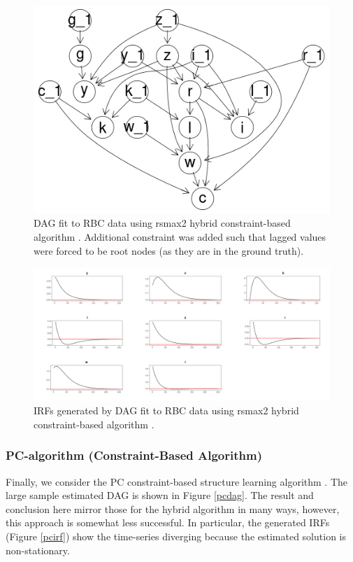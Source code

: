 \documentclass{article}
\begin{document}
\begin{figure}
  \centering  
  \includegraphics[width=0.6\linewidth]{images/rbc_hybrid_dag.png}
  \caption{DAG fit to RBC data using rsmax2 hybrid constraint-based algorithm \parencite{scutari2014multiple}. Additional constraint was added such that lagged values were forced to be root nodes (as they are in the ground truth).}
  \label{hdag}
\end{figure}

\begin{figure}
  \centering  
  \includegraphics[width=0.6\linewidth]{images/rbc_hybrid_irf.png}
  \caption{IRFs generated by DAG fit to RBC data using rsmax2 hybrid constraint-based algorithm \parencite{scutari2014multiple}.}
  \label{hirf}
\end{figure}

\subsubsection{PC-algorithm (Constraint-Based Algorithm)} \label{pc}

Finally, we consider the PC constraint-based structure learning algorithm \parencite{spirtes2000causation} \parencite{kalisch2007estimating}. The large sample estimated DAG is shown in Figure \ref{pcdag}. The result and conclusion here mirror those for the hybrid algorithm in many ways, however, this approach is somewhat less successful. In particular, the generated IRFs (Figure \ref{pcirf}) show the time-series diverging because the estimated solution is non-stationary.  
\end{document}
